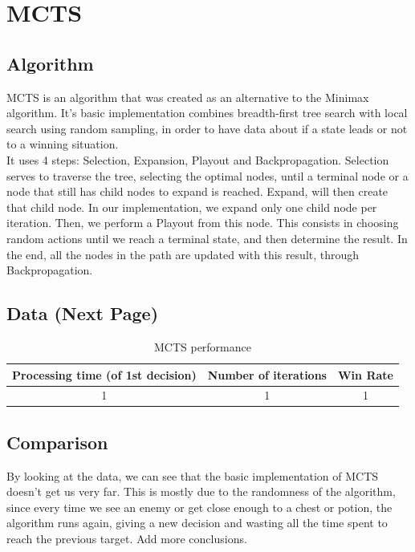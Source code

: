 \documentclass{article}
\begin{document}
  \section{MCTS}
  \subsection{Algorithm}
  MCTS is an algorithm that was created as an alternative to the Minimax algorithm. It's basic implementation combines breadth-first tree search with local search using
  random sampling, in order to have data about if a state leads or not to a winning situation.\\
  It uses 4 steps: Selection, Expansion, Playout and Backpropagation. Selection serves to traverse the tree, selecting the optimal nodes, until a terminal node or a node that 
  still has child nodes to expand is reached. Expand, will then create that child node. In our implementation, we expand only one child node per iteration. Then, we perform 
  a Playout from this node. This consists in choosing random actions until we reach a terminal state, and then determine the result.
  In the end, all the nodes in the path are updated with this result, through Backpropagation.
  
  \subsection{Data (Next Page)}
  \begin{table}[h!]
    \centering
    \caption{MCTS performance}
    \label{tab:tableMCTS1}
    \begin{tabular}{c|c|c}
      \textbf{Processing time (of 1st decision)} & \textbf{Number of iterations} & \textbf{Win Rate}\\
      \hline
      1 & 1 & 1
    \end{tabular}
  \end{table}

  \subsection{Comparison}
  By looking at the data, we can see that the basic implementation of MCTS doesn't get us very far. This is mostly due to the randomness of the algorithm, 
  since every time we see an enemy or get close enough to a chest or potion, the algorithm runs again, giving a new decision and wasting all 
  the time spent to reach the previous target.
  Add more conclusions.\\
\end{document}
